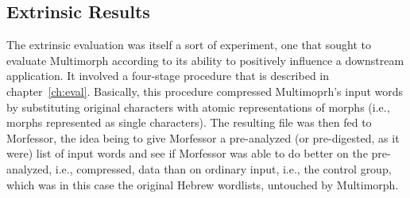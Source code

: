 \begin{enumerate}
{{%

\subsection{Extrinsic Results}

The extrinsic evaluation was itself a sort of experiment, one that sought to evaluate Multimorph according to its ability to positively influence a downstream application. It involved a four-stage procedure that is described in chapter~\ref{ch:eval}. Basically, this procedure compressed Multimoprh's input words by substituting original characters with atomic representations of morphs (i.e., morphs represented as single characters). The resulting file was then fed to Morfessor, the idea being to give Morfessor a pre-analyzed (or pre-digested, as it were) list of input words and see if Morfessor was able to do better on the pre-analyzed, i.e., compressed, data than on ordinary input, i.e., the control group, which was in this case the original Hebrew wordlists, untouched by Multimorph.

}}
\end{enumerate}
